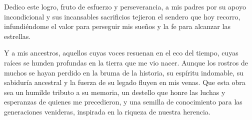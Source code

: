 

Dedico este logro, fruto de esfuerzo y perseverancia, a mis padres por su apoyo incondicional y sus incansables sacrificios tejieron el sendero que hoy recorro, infundiéndome el valor para perseguir mis sueños y la fe para alcanzar las estrellas.

Y a mis ancestros, aquellos cuyas voces resuenan en el eco del tiempo, cuyas raíces se hunden profundas en la tierra que me vio nacer. Aunque los rostros de muchos se hayan perdido en la bruma de la historia, su espíritu indomable, su sabiduría ancestral y la fuerza de su legado fluyen en mis venas. Que esta obra sea un humilde tributo a su memoria, un destello que honre las luchas y esperanzas de quienes me precedieron, y una semilla de conocimiento para las generaciones venideras, inspirada en la riqueza de nuestra herencia.
